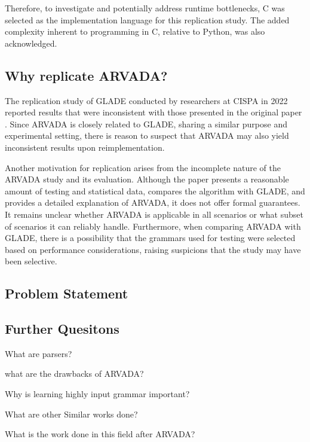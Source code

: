 \vspace{\baselineskip}

Therefore, to investigate and potentially address runtime bottlenecks, C was selected as the implementation language for this replication study. The added complexity inherent to programming in C, relative to Python, was also acknowledged.

\subsection{Why replicate ARVADA?}
The replication study of GLADE \cite{bastaniSynthesizingProgramInput} conducted by researchers at CISPA \cite{bendrissouSynthesizingInputGrammars2022} in 2022 reported results that were inconsistent with those presented in the original paper \cite{bastaniSynthesizingProgramInput}. Since ARVADA is closely related to GLADE, sharing a similar purpose and experimental setting, there is reason to suspect that ARVADA may also yield inconsistent results upon reimplementation.

\vspace{\baselineskip}

Another motivation for replication arises from the incomplete nature of the ARVADA study and its evaluation. Although the paper presents a reasonable amount of testing and statistical data, compares the algorithm with GLADE, and provides a detailed explanation of ARVADA, it does not offer formal guarantees. It remains unclear whether ARVADA is applicable in all scenarios or what subset of scenarios it can reliably handle. Furthermore, when comparing ARVADA with GLADE, there is a possibility that the grammars used for testing were selected based on performance considerations, raising suspicions that the study may have been selective.


\subsection{Problem Statement}

\subsection{Further Quesitons}

What are parsers?

what are the drawbacks of ARVADA?

Why is learning highly input grammar important?

What are other Similar works done?

What is the work done in this field after ARVADA?


